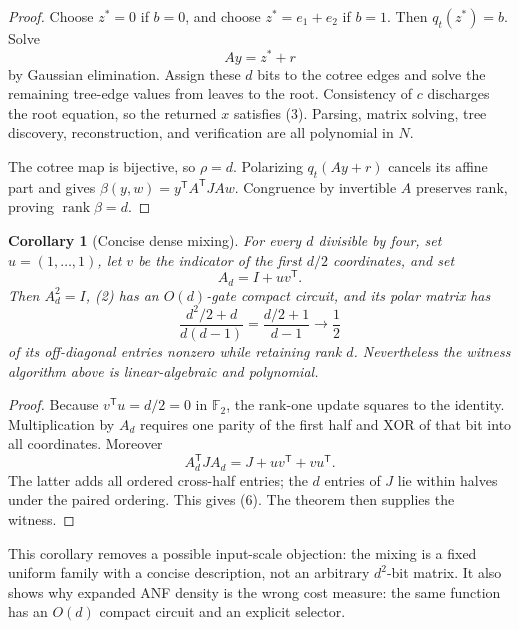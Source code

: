 \documentclass[11pt]{article}
\newtheorem{corollary}[theorem]{Corollary}
\newcommand{\F}{\mathbb F_2}
\begin{document}
\begin{proof}
Choose $z^*=0$ if $b=0$, and choose
$z^*=e_1+e_2$ if $b=1$.  Then $q_t(z^*)=b$.  Solve
\[
 Ay=z^*+r                                                     \tag{4}
\]
by Gaussian elimination.  Assign these $d$ bits to the cotree edges and solve
the remaining tree-edge values from leaves to the root.  Consistency of $c$
discharges the root equation, so the returned $x$ satisfies (3).  Parsing,
matrix solving, tree discovery, reconstruction, and verification are all
polynomial in $N$.

The cotree map is bijective, so $\rho=d$.  Polarizing $q_t(Ay+r)$ cancels its
affine part and gives
$\beta(y,w)=y^{\mathsf T}A^{\mathsf T}JAw$.  Congruence by invertible $A$
preserves rank, proving $\operatorname{rank}\beta=d$.
\end{proof}

\begin{corollary}[Concise dense mixing]
For every $d$ divisible by four, set $u=(1,\ldots,1)$, let $v$ be the indicator
of the first $d/2$ coordinates, and set
\[
 A_d=I+uv^{\mathsf T}.                                      \tag{5}
\]
Then $A_d^2=I$, (2) has an $O(d)$-gate compact circuit, and its polar matrix
has
\[
 \frac{d^2/2+d}{d(d-1)}=\frac{d/2+1}{d-1}\longrightarrow\frac12           \tag{6}
\]
of its off-diagonal entries nonzero while retaining rank $d$.  Nevertheless
the witness algorithm above is linear-algebraic and polynomial.
\end{corollary}

\begin{proof}
Because $v^{\mathsf T}u=d/2=0$ in $\F$, the rank-one update squares to the
identity.  Multiplication by $A_d$ requires one parity of the first half and
XOR of that bit into all coordinates.  Moreover
\[
 A_d^{\mathsf T}JA_d=J+uv^{\mathsf T}+vu^{\mathsf T}.
\]
The latter adds all ordered cross-half entries; the $d$ entries of $J$ lie
within halves under the paired ordering.  This gives (6).  The theorem then
supplies the witness.
\end{proof}

This corollary removes a possible input-scale objection: the mixing is a fixed
uniform family with a concise description, not an arbitrary $d^2$-bit matrix.
It also shows why expanded ANF density is the wrong cost measure: the same
function has an $O(d)$ compact circuit and an explicit selector.
\end{document}
